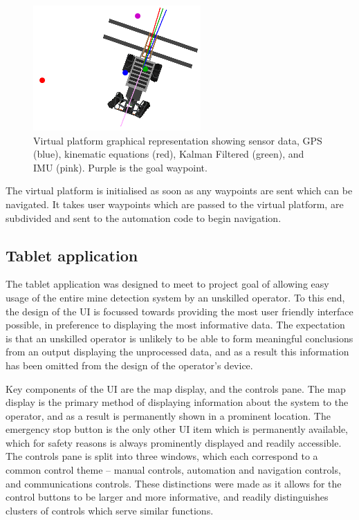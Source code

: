 \documentclass[main.tex]{subfiles}
\begin{document}
\begin{figure}[ht]
\includegraphics[]{4-DetailedDesign/dataVisibleVirtualPlatform.PNG}
\centering
\caption[Virtual platform graphical representation]{Virtual platform graphical representation showing sensor data, GPS (blue), kinematic equations (red), Kalman Filtered (green), and IMU (pink). Purple is the goal waypoint.} 
\end{figure}
The virtual platform is initialised as soon as any waypoints are sent which can be navigated. It takes user waypoints which are passed to the virtual platform, are subdivided and sent to the automation code to begin navigation.

\subsection{Tablet application}
The tablet application was designed to meet to project goal of allowing easy usage of the entire mine detection system by an unskilled operator. To this end, the design of the UI is focussed towards providing the most user friendly interface possible, in preference to displaying the most informative data. The expectation is that an unskilled operator is unlikely to be able to form meaningful conclusions from an output displaying the unprocessed data, and as a result this information has been omitted from the design of the operator’s device. 

Key components of the UI are the map display, and the controls pane. The map display is the primary method of displaying information about the system to the operator, and as a result is permanently shown in a prominent location. The emergency stop button is the only other UI item which is permanently available, which for safety reasons is always prominently displayed and readily accessible. The controls pane is split into three windows, which each correspond to a common control theme – manual controls, automation and navigation controls, and communications controls. These distinctions were made as it allows for the control buttons to be larger and more informative, and readily distinguishes clusters of controls which serve similar functions. 
\end{document}
